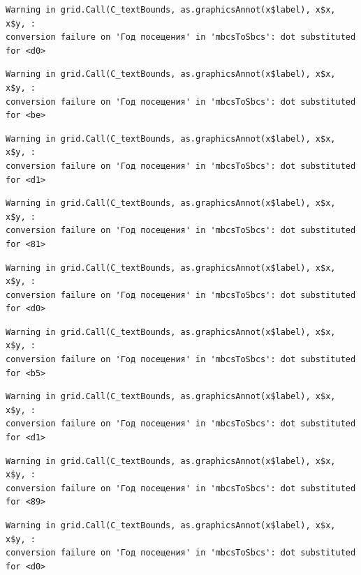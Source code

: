 \documentclass[
  letterpaper,
  DIV=11,
  numbers=noendperiod]{scrartcl}
\begin{document}
\begin{verbatim}
Warning in grid.Call(C_textBounds, as.graphicsAnnot(x$label), x$x, x$y, :
conversion failure on 'Год посещения' in 'mbcsToSbcs': dot substituted for <d0>
\end{verbatim}

\begin{verbatim}
Warning in grid.Call(C_textBounds, as.graphicsAnnot(x$label), x$x, x$y, :
conversion failure on 'Год посещения' in 'mbcsToSbcs': dot substituted for <be>
\end{verbatim}

\begin{verbatim}
Warning in grid.Call(C_textBounds, as.graphicsAnnot(x$label), x$x, x$y, :
conversion failure on 'Год посещения' in 'mbcsToSbcs': dot substituted for <d1>
\end{verbatim}

\begin{verbatim}
Warning in grid.Call(C_textBounds, as.graphicsAnnot(x$label), x$x, x$y, :
conversion failure on 'Год посещения' in 'mbcsToSbcs': dot substituted for <81>
\end{verbatim}

\begin{verbatim}
Warning in grid.Call(C_textBounds, as.graphicsAnnot(x$label), x$x, x$y, :
conversion failure on 'Год посещения' in 'mbcsToSbcs': dot substituted for <d0>
\end{verbatim}

\begin{verbatim}
Warning in grid.Call(C_textBounds, as.graphicsAnnot(x$label), x$x, x$y, :
conversion failure on 'Год посещения' in 'mbcsToSbcs': dot substituted for <b5>
\end{verbatim}

\begin{verbatim}
Warning in grid.Call(C_textBounds, as.graphicsAnnot(x$label), x$x, x$y, :
conversion failure on 'Год посещения' in 'mbcsToSbcs': dot substituted for <d1>
\end{verbatim}

\begin{verbatim}
Warning in grid.Call(C_textBounds, as.graphicsAnnot(x$label), x$x, x$y, :
conversion failure on 'Год посещения' in 'mbcsToSbcs': dot substituted for <89>
\end{verbatim}

\begin{verbatim}
Warning in grid.Call(C_textBounds, as.graphicsAnnot(x$label), x$x, x$y, :
conversion failure on 'Год посещения' in 'mbcsToSbcs': dot substituted for <d0>
\end{verbatim}
\end{document}
